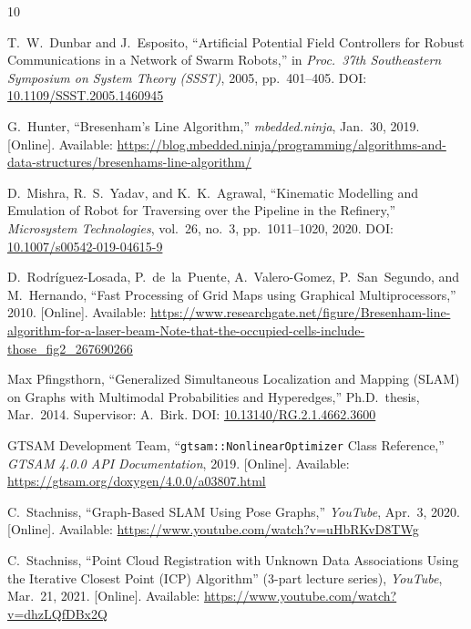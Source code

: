 \documentclass[12pt]{report}
\begin{document}
\renewcommand{\bibname}{References}
\begin{thebibliography}{10}

T.~W.~Dunbar and J.~Esposito,
``Artificial Potential Field Controllers for Robust Communications in a Network of Swarm Robots,''
in \textit{Proc.\ 37th Southeastern Symposium on System Theory (SSST)}, 2005, pp.\ 401--405.
DOI: \href{https://doi.org/10.1109/SSST.2005.1460945}{10.1109/SSST.2005.1460945}

G.~Hunter,
``Bresenham's Line Algorithm,''
\textit{mbedded.ninja}, Jan.\ 30, 2019.
[Online]. Available: \url{https://blog.mbedded.ninja/programming/algorithms-and-data-structures/bresenhams-line-algorithm/}

D.~Mishra, R.~S.~Yadav, and K.~K.~Agrawal,
``Kinematic Modelling and Emulation of Robot for Traversing over the Pipeline in the Refinery,''
\textit{Microsystem Technologies}, vol.\ 26, no.\ 3, pp.\ 1011--1020, 2020.
DOI: \href{https://doi.org/10.1007/s00542-019-04615-9}{10.1007/s00542-019-04615-9}

D.~Rodr\'iguez-Losada, P.~de~la~Puente, A.~Valero-Gomez, P.~San~Segundo, and M.~Hernando,
``Fast Processing of Grid Maps using Graphical Multiprocessors,''
2010.
[Online]. Available: \url{https://www.researchgate.net/figure/Bresenham-line-algorithm-for-a-laser-beam-Note-that-the-occupied-cells-include-those_fig2_267690266}

Max Pfingsthorn,
``Generalized Simultaneous Localization and Mapping (SLAM) on Graphs with Multimodal Probabilities and Hyperedges,''
Ph.D.\ thesis, Mar.\ 2014.
Supervisor: A.~Birk.
DOI: \href{https://doi.org/10.13140/RG.2.1.4662.3600}{10.13140/RG.2.1.4662.3600}

GTSAM Development Team,
``\texttt{gtsam::NonlinearOptimizer} Class Reference,''
\textit{GTSAM 4.0.0 API Documentation}, 2019.
[Online]. Available: \url{https://gtsam.org/doxygen/4.0.0/a03807.html}

C.~Stachniss,
``Graph-Based SLAM Using Pose Graphs,''
\textit{YouTube}, Apr.\ 3, 2020.
[Online]. Available: \url{https://www.youtube.com/watch?v=uHbRKvD8TWg}

C.~Stachniss,
``Point Cloud Registration with Unknown Data Associations Using the Iterative Closest Point (ICP) Algorithm'' (3-part lecture series),
\textit{YouTube}, Mar.\ 21, 2021.
[Online]. Available: \url{https://www.youtube.com/watch?v=dhzLQfDBx2Q}


\end{thebibliography}
\end{document}
